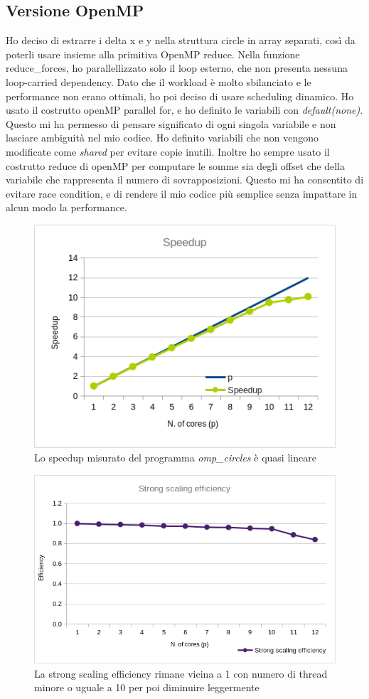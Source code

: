 \documentclass[a4paper,11pt, twoside]{report}
\begin{document}
\subsection*{Versione OpenMP}
Ho deciso di estrarre i delta x e y nella struttura circle in array separati, così da poterli usare insieme alla primitiva OpenMP reduce.
Nella funzione reduce\_forces, ho parallellizzato solo il loop esterno, che non presenta nessuna loop-carried dependency.
Dato che il workload è molto sbilanciato e le performance non erano ottimali, ho poi deciso di usare scheduling dinamico.
Ho usato il costrutto openMP parallel for, e ho definito le variabili con \textit{default(none)}.
Questo mi ha permesso di pensare significato di ogni singola variabile e non lasciare ambiguità nel mio codice.
Ho definito variabili che non vengono modificate come \textit{shared} per evitare copie inutili.
Inoltre ho sempre usato il costrutto reduce di openMP per computare le somme sia degli offset che della variabile che rappresenta il numero di sovrapposizioni.
Questo mi ha consentito di evitare race condition, e di rendere il mio codice più semplice senza impattare in alcun modo la performance.
\begin{figure}[H]
    \includegraphics[scale=0.5]{images/omp_speedup.png}
    \caption[]{Lo speedup misurato del programma \textit{omp\_circles} è quasi lineare}
\end{figure}
\begin{figure}[H]
    \includegraphics[scale=0.5]{images/omp_strong.png}
    \caption[]{La strong scaling efficiency rimane vicina a 1 con numero di thread minore o uguale a 10 per poi diminuire leggermente}
\end{figure}
\end{document}
